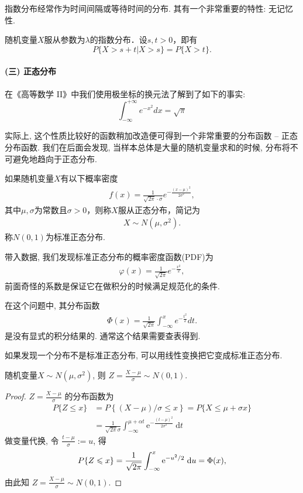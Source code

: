 指数分布经常作为时间间隔或等待时间的分布. 其有一个非常重要的特性: 无记忆性.

\begin{proposition}[指数分布的无记忆性]
    随机变量$X$服从参数为$\lambda$的指数分布．设$s,t>0$，即有
    \[ P\{X>s+t|X>s\}=P\{X>t\}.\]
\end{proposition}

\paragraph{(三) 正态分布}

在《高等数学 II》中我们使用极坐标的换元法了解到了如下的事实:
$$
    \int_{-\infty}^{+\infty}e^{-x^2} dx =\sqrt \pi
$$

实际上, 这个性质比较好的函数稍加改造便可得到一个非常重要的分布函数 --
正态分布函数. 我们在后面会发现, 当样本总体是大量的随机变量求和的时候,
分布将不可避免地趋向于正态分布.

\begin{definition}
    如果随机变量$X$有以下概率密度
    \begin{align*}
        f(x)=\frac1{\sqrt{2\pi}\cdot\sigma}e^{-\frac{(x-\mu)^2}{2\sigma^2}},
    \end{align*}
    其中$\mu,\sigma$为常数且$\sigma>0$，则称$X$服从正态分布，简记为%
    \begin{align*}
        X \sim N(\mu,\sigma^2).
    \end{align*}
    称$N(0,1)$为标准正态分布.
\end{definition}

带入数据, 我们发现标准正态分布的概率密度函数(PDF)为
\begin{align*}
\varphi(x)=\frac1{\sqrt{2\pi}}e^{-\frac{x^2}{2}},
\end{align*}
前面奇怪的系数是保证它在做积分的时候满足规范化的条件. 

在这个问题中, 其分布函数
  \begin{align*}
  \Phi(x)=\frac1{\sqrt{2\pi}}\int_{-\infty}^xe^{-\frac{t^2}{2}}dt.
  \end{align*}
是没有显式的积分结果的. 通常这个结果需要查表得到. 

如果发现一个分布不是标准正态分布, 可以用线性变换把它变成标准正态分布. 

\begin{proposition}
  随机变量$X\sim N(\mu,\sigma^2)$, 则 $Z=\frac{X-\mu}{\sigma}\sim N(0,1)$.
  \end{proposition}

  \begin{proof}
    { $Z=\frac{X-\mu}{\sigma}$ 的分布函数为$$
 \begin{aligned}
 P\{Z \leqslant x\} & =P\left\{{(X-\mu)}/{\sigma} \leqslant x\right\}=P\{X \leqslant \mu+\sigma x\} \\
 & =\frac{1}{\sqrt{2 \pi} \sigma} \int_{-\infty}^{\mu+\alpha t} \mathrm{e}^{-\frac{(t-\mu)^2}{2 \sigma^2}} \mathrm{~d} t
\end{aligned}
$$
做变量代换, 令 $\frac{t-\mu}{\sigma}:=u$, 得$$
\small P\{Z \leqslant x\}=\frac{1}{\sqrt{2 \pi}} \int_{-\infty}^x \mathrm{e}^{-u^2 / 2} \mathrm{~d} u=\Phi(x),
$$
由此知 $Z=\frac{X-\mu}{\sigma} \sim N(0,1)$.}
\end{proof}

